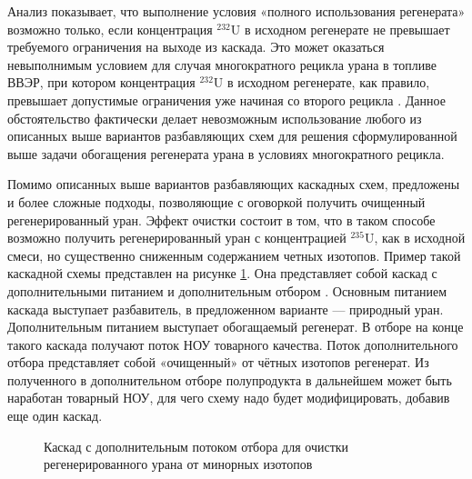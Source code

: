 Анализ показывает, что выполнение условия «полного использования регенерата» возможно только, если концентрация $^{232}$U в исходном регенерате не превышает требуемого ограничения на выходе из каскада. Это может оказаться невыполнимым условием для случая многократного рецикла урана в топливе ВВЭР, при котором концентрация $^{232}$U в исходном регенерате, как правило, превышает допустимые ограничения уже начиная со второго рецикла \cite{rodionovaAnalizTehnikoekonomicheskihHarakteristik2019,smirnovFizikotehnicheskieProblemyObogashcheniya2020}. Данное обстоятельство фактически делает невозможным использование любого из описанных выше вариантов разбавляющих схем для решения сформулированной выше задачи обогащения регенерата урана в условиях многократного рецикла.


Помимо описанных выше вариантов разбавляющих каскадных схем, предложены и более сложные подходы, позволяющие с оговоркой получить очищенный регенерированный уран. Эффект очистки состоит в том, что в таком способе возможно получить регенерированный уран с концентрацией $^{235}$U, как в исходной смеси, но существенно сниженным содержанием четных изотопов. Пример такой каскадной схемы представлен на рисунке \ref{fig:3_out}. Она представляет собой каскад с дополнительными питанием и дополнительным отбором \cite{palkinSeparationUraniumIsotopes2010}. Основным питанием каскада выступает разбавитель, в предложенном варианте --- природный уран. Дополнительным питанием выступает обогащаемый регенерат. В отборе на конце такого каскада получают поток НОУ товарного качества. Поток дополнительного отбора представляет собой «очищенный» от чётных изотопов регенерат. Из полученного в дополнительном отборе полупродукта в дальнейшем может быть наработан товарный НОУ, для чего схему надо будет модифицировать, добавив еще один каскад.

\begin{figure}[ht]
  \caption{Каскад с дополнительным потоком отбора для очистки регенерированного урана от минорных изотопов}\label{fig:3_out}
\end{figure}

